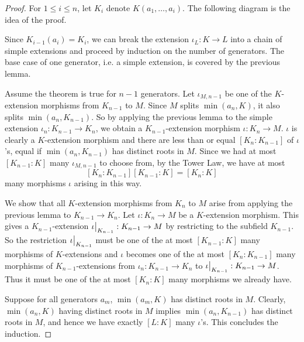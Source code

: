 \documentclass[../book.tex]{subfiles}
\begin{document}
\begin{proof}
    For $1 \leq i \leq n$, let $K_i$ denote $K(a_1,\dots,a_i)$.
    The following diagram is the idea of the proof. 
    \begin{figure}[H]
        \centering
    \end{figure}
    Since $K_{i-1}(a_i) = K_i$, 
    we can break the extension $\iota_L : K \to L$ into a chain of simple extensions
    and proceed by induction on the number of generators. 
    The base case of one generator, i.e. a simple extension, 
    is covered by the previous lemma. 
    
    Assume the theorem is true for $n-1$ generators. 
    Let $\iota_{M,n-1}$ be one of the $K$-extension morphisms from
    $K_{n-1}$ to $M$. 
    Since $M$ splits $\min(a_n,K)$, it also splits $\min(a_n,K_{n-1})$.
    So by applying the previous lemma to the simple extension
    $\iota_n : K_{n-1} \to K_n$,
    we obtain a $K_{n-1}$-extension morphism $\iota : K_n \to M$.
    $\iota$ is clearly a $K$-extension morphism and
    there are less than or equal $[K_n : K_{n-1}]$ of $\iota$'s,
    equal if $\min(a_n,K_{n-1})$ has distinct roots in $M$. 
    Since we had at most $[K_{n-1} : K]$ many $\iota_{M,n-1}$
    to choose from, by the Tower Law, we have at most \[
        [K_n : K_{n-1}][K_{n-1} : K] = [K_n : K]
    \]
    many morphisms $\iota$ arising in this way.
    
    We show that all $K$-extension morphisms from $K_n$ to $M$
    arise from applying the previous lemma to $K_{n-1} \to K_n$. 
    Let $\iota : K_n \to M$ be a $K$-extension morphism. 
    This gives a $K_{n-1}$-extension $\res{\iota}{K_{n-1}} : K_{n-1} \to M$ 
    by restricting to the subfield $K_{n-1}$.
    So the restriction $\res{\iota}{K_{n-1}}$ must be 
    one of the at most $[K_{n-1} : K]$ many morphisms of $K$-extensions
    and $\iota$ becomes one of the at most $[K_n : K_{n-1}]$ many 
    morphisms of $K_{n-1}$-extensions from 
    $\iota_n : K_{n-1} \to K_n$ to $\res{\iota}{K_{n-1}} : K_{n-1} \to M$.
    Thus it must be one of the at most $[K_n : K]$ many morphisms we already have. 
    
    Suppose for all generators $a_m$, $\min(a_m,K)$ has distinct roots in $M$.
    Clearly, $\min(a_n,K)$ having distinct roots in $M$ implies 
    $\min(a_n,K_{n-1})$ has distinct roots in $M$,
    and hence we have exactly $[L : K]$ many $\iota$'s.
    This concludes the induction.
\end{proof}
\end{document}
